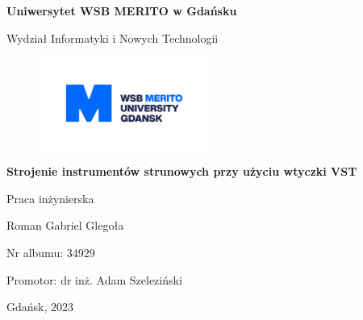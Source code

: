 \begin{titlepage}
    \centering\vspace*{1cm}
    \Large{\textbf{Uniwersytet WSB MERITO w Gdańsku}}\vspace{1.3cm}

    \Large{Wydział Informatyki i Nowych Technologii}\vspace{1.3cm}

    \begin{figure}[h!]
        \centering
        \includegraphics[width=0.5\textwidth]{assets/logo-wsb-merito-gdansk.png}
    \end{figure} \vspace{1.5cm}

    \huge{\textbf{Strojenie instrumentów strunowych przy użyciu wtyczki VST}} \vspace{1.5cm}

    \Large{Praca inżynierska} \vfill

    \Large{Roman Gabriel Glegoła} \vspace{0.8cm}

    \Large{Nr albumu: 34929} \vfill

    \Large{Promotor: dr inż. Adam Szeleziński} \vspace{1.5cm}

    \Large{Gdańsk, 2023}
\end{titlepage}